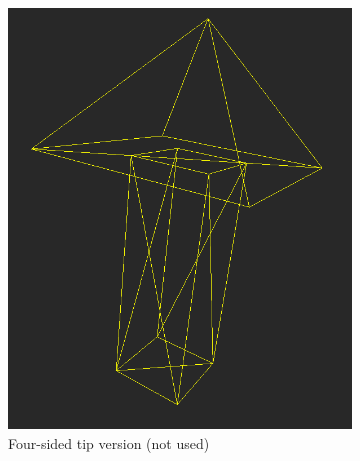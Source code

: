 \begin{figure}[h]
\centering
	\begin{subfigure}{0.3\textwidth}
	\includegraphics[width=\textwidth]{./img/4sided_arrow.PNG}
    \caption{Four-sided tip version (not used)}
    \label{fig:meshdiff-4sided_arrow}
	\end{subfigure}
    \qquad
    \begin{subfigure}{0.3\textwidth}

\end{subfigure}
\end{figure}

